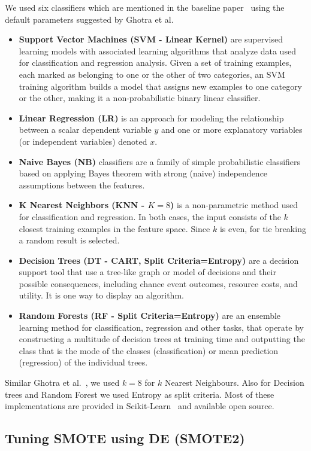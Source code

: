 \documentclass[10pt,conference]{IEEEtran}
\newcommand{\bi}{\begin{itemize}[leftmargin=0.4cm]}
\newcommand{\ei}{\end{itemize}}
\theoremstyle{break}
\theoremstyle{break}
\begin{document}
We used six classifiers which are mentioned in the baseline paper~\cite{ghotra2015revisiting}
using the default
parameters  suggested by Ghotra et al.

\bi
 \item \textbf{Support Vector Machines (SVM - Linear Kernel)} are supervised learning models with associated learning algorithms that analyze data used for classification and regression analysis. Given a set of training examples, each marked as belonging to one or the other of two categories, an SVM training algorithm builds a model that assigns new examples to one category or the other, making it a non-probabilistic binary linear classifier.
 \item \textbf{Linear Regression (LR)} is an approach for modeling the relationship between a scalar dependent variable $y$ and one or more explanatory variables (or independent variables) denoted $x$.
 \item \textbf{Naive Bayes (NB)} classifiers are a family of simple probabilistic classifiers based on applying Bayes theorem with strong (naive) independence assumptions between the features.
 \item \textbf{K Nearest Neighbors (KNN - $K=8$)} is a non-parametric method used for classification and regression. In both cases, the input consists of the $k$ closest training examples in the feature space. Since $k$ is even, for tie breaking a random result is selected.
 \item \textbf{Decision Trees (DT - CART, Split Criteria=Entropy)} are a decision support tool that use a tree-like graph or model of decisions and their possible consequences, including chance event outcomes, resource costs, and utility. It is one way to display an algorithm.
 \item \textbf{Random Forests (RF - Split Criteria=Entropy)} are an ensemble learning method for classification, regression and other tasks, that operate by constructing a multitude of decision trees at training time and outputting the class that is the mode of the classes (classification) or mean prediction (regression) of the individual trees. 
\ei

Similar Ghotra et al.~\cite{ghotra2015revisiting}, we used $k=8$ for $k$ Nearest Neighbours. Also for Decision trees and Random Forest we used Entropy as split criteria. Most of these implementations are provided in Scikit-Learn~\cite{pedregosa2011scikit} and available open source.

\subsection{\textbf{Tuning SMOTE using DE (SMOTE2)}}
\label{sect:tuning}
\end{document}
